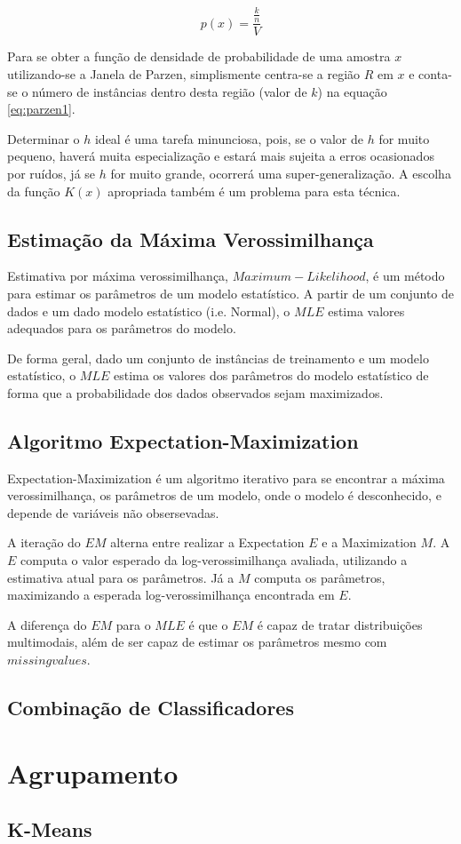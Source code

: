 \begin{equation}
\label{eq:parzen1}
p(x) = \frac{\frac{k}{n}}{V}
\end{equation}

Para se obter a função de densidade de probabilidade de uma amostra $x$ utilizando-se a Janela de Parzen, simplismente centra-se a região $R$ em $x$ e conta-se o número de instâncias dentro desta região (valor de $k$) na equação \ref{eq:parzen1}.

Determinar o $h$ ideal é uma tarefa minunciosa, pois, se o valor de $h$ for muito pequeno, haverá muita especialização e estará mais sujeita a erros ocasionados por ruídos, já se $h$ for muito grande, ocorrerá uma super-generalização. A escolha da função $K(x)$ apropriada também é um problema para esta técnica.

\subsection{Estimação da Máxima Verossimilhança}
\label{subsec:mle}

Estimativa por máxima verossimilhança, $Maximum-Likelihood$, é um método para estimar os parâmetros de um modelo estatístico. A partir de um conjunto de dados e um dado modelo estatístico (i.e. Normal), o $MLE$ estima valores adequados para os parâmetros do modelo.

De forma geral, dado um conjunto de instâncias de treinamento e um modelo estatístico, o $MLE$ estima os valores dos parâmetros do modelo estatístico de forma que a probabilidade dos dados observados sejam maximizados.

\subsection{Algoritmo Expectation-Maximization}
\label{subsec:em}
Expectation-Maximization é um algoritmo iterativo para se encontrar a máxima verossimilhança, os parâmetros de um modelo, onde o modelo é desconhecido, e depende de variáveis não obsersevadas. 

A iteração do $EM$ alterna entre realizar a Expectation $E$ e a Maximization $M$. A $E$ computa o valor esperado da log-verossimilhança avaliada, utilizando a estimativa atual para os parâmetros. Já a $M$ computa os parâmetros, maximizando a esperada log-verossimilhança encontrada em $E$.

A diferença do $EM$ para o $MLE$ é que o $EM$ é capaz de tratar distribuições multimodais, além de ser capaz de estimar os parâmetros mesmo com $missing values$.


\subsection{Combinação de Classificadores}

\section{Agrupamento}
\subsection{K-Means}



